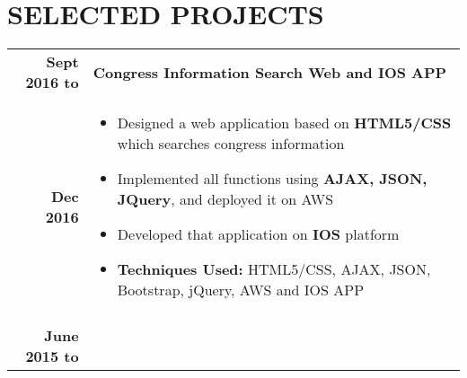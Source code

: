 \documentclass[a4paper, 11pt]{extarticle} %
\begin{document}
\section{SELECTED PROJECTS}
\vspace{-0.3cm}
\begin{longtable}{r | p{16cm}}
	\textbf{Sept 2016 to}
	&
	\textbf{Congress Information Search Web and IOS APP}\\
	\textbf{Dec 2016}&
	\small{
	\vspace{-0.3cm}
	\begin{itemize}[leftmargin=*]
		\item Designed a web application based on \textbf{HTML5/CSS} which searches congress information
		\item Implemented all functions using \textbf{AJAX, JSON, JQuery}, and deployed it on AWS
		\item Developed that application on \textbf{IOS} platform
		\item \textbf{Techniques Used:} HTML5/CSS, AJAX, JSON, Bootstrap, jQuery, AWS and IOS APP
	\vspace{-0.4cm}
	\end{itemize}
	}\\


%		
%		
%		
%
%
%
%
%

\multicolumn{1}{c}{} \\
			\textbf{June 2015 to}
		
		 &
		

\end{longtable}
\end{document}
